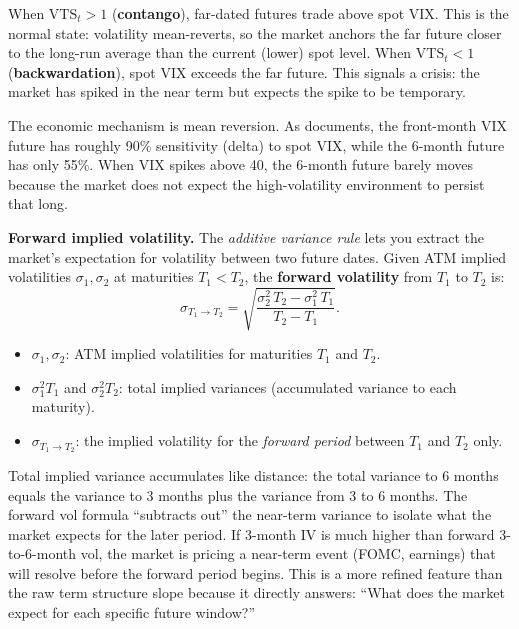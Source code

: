 When $\text{VTS}_t > 1$ (\textbf{contango}), far-dated futures trade above spot VIX.
This is the normal state: volatility mean-reverts, so the market anchors the far future closer to the long-run average than the current (lower) spot level.
When $\text{VTS}_t < 1$ (\textbf{backwardation}), spot VIX exceeds the far future.
This signals a crisis: the market has spiked in the near term but expects the spike to be temporary.

The economic mechanism is mean reversion.
As \citet{Bennett2014} documents, the front-month VIX future has roughly 90\% sensitivity (delta) to spot VIX, while the 6-month future has only 55\%.
When VIX spikes above 40, the 6-month future barely moves because the market does not expect the high-volatility environment to persist that long.

\textbf{Forward implied volatility.}
The \emph{additive variance rule} lets you extract the market's expectation for volatility between two future dates.
Given ATM implied volatilities $\sigma_1, \sigma_2$ at maturities $T_1 < T_2$, the \textbf{forward volatility} from $T_1$ to $T_2$ is:
\begin{equation}\label{eq:forward-vol}
\sigma_{T_1 \to T_2} = \sqrt{\frac{\sigma_2^2\,T_2 - \sigma_1^2\,T_1}{T_2 - T_1}}.
\end{equation}
\begin{itemize}[nosep]
  \item $\sigma_1, \sigma_2$: ATM implied volatilities for maturities $T_1$ and $T_2$.
  \item $\sigma_1^2 T_1$ and $\sigma_2^2 T_2$: total implied variances (accumulated variance to each maturity).
  \item $\sigma_{T_1 \to T_2}$: the implied volatility for the \emph{forward period} between $T_1$ and $T_2$ only.
\end{itemize}

\begin{intuition}
Total implied variance accumulates like distance: the total variance to 6 months equals the variance to 3 months plus the variance from 3 to 6 months.
The forward vol formula ``subtracts out'' the near-term variance to isolate what the market expects for the later period.
If 3-month IV is much higher than forward 3-to-6-month vol, the market is pricing a near-term event (FOMC, earnings) that will resolve before the forward period begins.
This is a more refined feature than the raw term structure slope because it directly answers: ``What does the market expect for each specific future window?''
\end{intuition}

